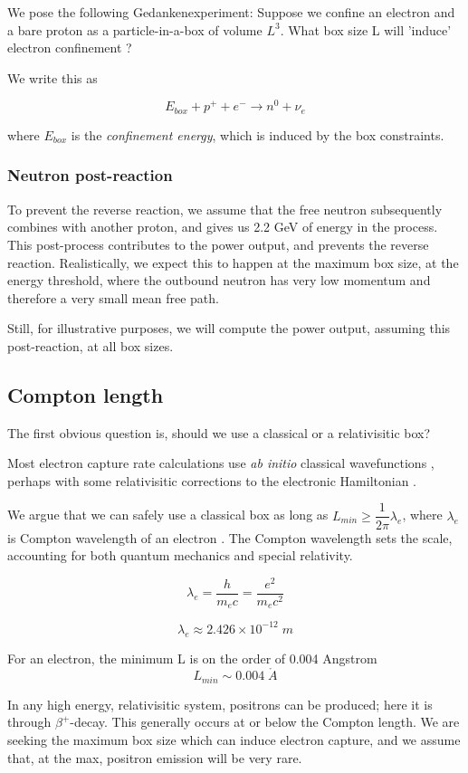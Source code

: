 \documentclass[%
 aip,
 jmp,%
 amsmath,amssymb,
 reprint,%
]{revtex4-1}
\begin{document}
We pose the following Gedankenexperiment:    Suppose we confine an electron and a bare proton as a particle-in-a-box of volume $L^3$.  What box size L will 'induce' electron confinement ?

We write this as

$$E_{box}+p^{+}+e^{-}\rightarrow n^{0}+\nu_{e}$$

where $E_{box}$ is the \emph{confinement energy}, which is induced by the box constraints. 

\subsubsection{Neutron post-reaction}

To prevent the reverse reaction, we assume that the free neutron subsequently combines with another proton, and gives us 2.2 GeV of energy in the process.  This post-process contributes to the power output, and prevents the reverse reaction.  Realistically, we expect this to happen at the maximum box size, at the energy threshold, where the outbound neutron has very low momentum and therefore a very small mean free path.  

Still, for illustrative purposes, we will compute the power output,  assuming this post-reaction,  at all box sizes.

\subsection{Compton length}
The first obvious question is, should we use a classical or a relativisitic box?   

Most electron capture rate calculations use \emph{ab initio} classical wavefunctions \cite{ec-review1,ec-review2}, perhaps with some relativisitic corrections to the electronic Hamiltonian \cite{martin}.

We argue that we can safely use a classical box as long as $L_{min} \ge \dfrac{1}{2\pi}\lambda_{e}$, where $\lambda_{e}$ is Compton wavelength of an electron \cite{relbox,compton,planck}.  The Compton wavelength sets the scale, accounting for both quantum mechanics and special relativity.

$$\lambda_{e}=\dfrac{h}{m_{e}c}=\dfrac{e^{2}}{m_{e}c^{2}}$$

$$\lambda_{e}\approx2.426\times 10^{-12}\;m$$

For an electron, the minimum L is on the order of 0.004 Angstrom 
$$L_{min}\sim0.004\;\mathring{A}$$ 

In any high energy, relativisitic system, positrons can be produced; here it is through $\beta^{+}$-decay. This generally occurs at or below the Compton length. We are seeking the maximum box size which can induce electron capture, and we assume that, at the max, positron emission will be very rare.
\end{document}

